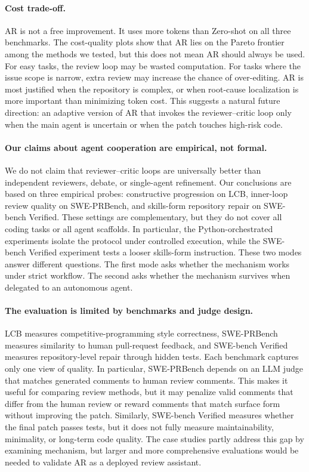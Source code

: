\documentclass{article}
\begin{document}
\paragraph{Cost trade-off.}
AR is not a free improvement. It uses more tokens than Zero-shot on all
three benchmarks. The cost-quality plots show that AR lies on the
Pareto frontier among the methods we tested, but this does not mean AR
should always be used. For easy tasks, the review loop may be wasted
computation. For tasks where the issue scope is narrow, extra review may
increase the chance of over-editing. AR is most justified when the repository is complex, or when
root-cause localization is more important than minimizing token cost.
This suggests a natural future direction: an adaptive version of AR that
invokes the reviewer--critic loop only when the main agent is uncertain
or when the patch touches high-risk code.

\paragraph{Our claims about agent cooperation are empirical, not formal.}
We do not claim that
reviewer--critic loops are universally better than independent
reviewers, debate, or single-agent refinement. Our conclusions are based
on three empirical probes: constructive progression on LCB, inner-loop
review quality on SWE-PRBench, and skills-form repository repair on
SWE-bench Verified. These settings are complementary, but they do not
cover all coding tasks or all agent scaffolds. In particular, the
Python-orchestrated experiments isolate the protocol under controlled execution, while the SWE-bench Verified experiment tests a looser
skills-form instruction. These two modes answer different questions.
The first mode asks whether the mechanism works under strict workflow.
The second asks whether the mechanism survives when delegated to an
autonomous  agent.

\paragraph{The evaluation is limited by benchmarks and judge design.}
LCB measures competitive-programming style correctness, SWE-PRBench
measures similarity to human pull-request feedback, and SWE-bench
Verified measures repository-level repair through hidden tests. Each
benchmark captures only one view of quality. In particular,
SWE-PRBench depends on an LLM judge that matches generated comments to
human review comments. This makes it useful for comparing review
methods, but it may penalize valid comments that differ from the human
review or reward comments that match surface form without improving the
patch. Similarly, SWE-bench Verified measures whether the final patch
passes tests, but it does not fully measure maintainability, minimality,
or long-term code quality. The case studies partly address this gap by
examining mechanism, but larger and more comprehensive evaluations would be needed to
validate AR as a deployed review assistant.
\end{document}
